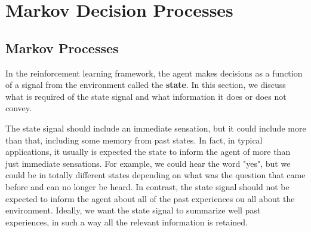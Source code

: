 
\chapter{Markov Decision Processes}

\section{Markov Processes}

In the reinforcement learning framework, the agent makes decisions as a function of a signal from the environment called the \textbf{state}. In this section, we discuss what is required of the state signal and what information it does or does not convey.

The state signal should include an immediate sensation, but it could include more than that, including some memory from past states. In fact, in typical applications, it usually is expected the state to inform the agent of more than just immediate sensations. For example, we could hear the word "yes", but we could be in totally different states depending on what was the question that came before and can no longer be heard. In contrast, the state signal should not be expected to inform the agent about all of the past experiences ou all about the environment. Ideally, we want the state signal to summarize well past experiences, in such a way all the relevant information is retained. 

